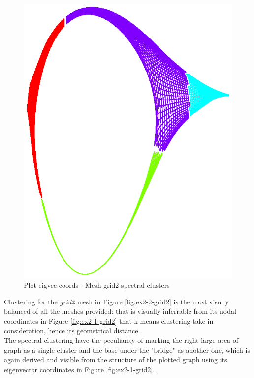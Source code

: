 \documentclass[unicode,11pt,a4paper,oneside,numbers=endperiod,openany]{scrartcl}
\begin{document}
\begin{figure}[H]
    \centering
    \caption{Plot eigvec coords - Mesh grid2 spectral clusters}
    \label{fig:ex2-2-grid2-eigs}
    \includegraphics[width=\textwidth, trim={0cm 1cm 0cm 0.5cm}, clip]{./img/ex2-2-grid2-eigs.eps}
\end{figure}

Clustering for the \textit{grid2} mesh in Figure \ref{fig:ex2-2-grid2} is the most visully balanced
of all the meshes provided:
that is visually inferrable from its nodal coordinates in Figure \ref{fig:ex2-1-grid2}
that k-means clustering take in consideration, hence its geometrical distance.\\
The spectral clustering have the peculiarity of marking the right large area of graph
as a single cluster and the base under the "bridge" as another one, which is again derived and visible
from the structure of the plotted graph using its eigenvector coordinates in Figure \ref{fig:ex2-1-grid2}.
\end{document}
